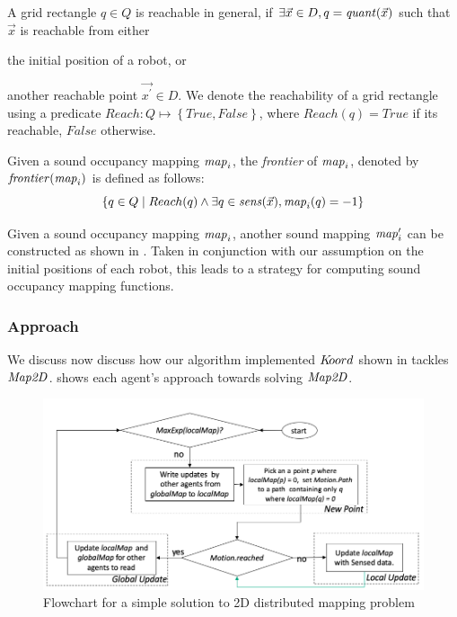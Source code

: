 A grid rectangle $q\in Q$ is reachable in general, if $\exists \Vec{x}\in D, q = \mathit{quant}(\Vec{x})$ such that $\Vec{x}$ is reachable from either \begin{inparaenum} [(a)]\item the initial position of a robot, or \item another reachable point $\Vec{x^\prime}\in D$. We denote the reachability of a grid rectangle using a predicate $\mathit{Reach} : Q \mapsto \left\{\mathit{True}, \mathit{False}\right\}$, where $\mathit{Reach}(q) = \mathit{True}$ if its reachable,  $\mathit{False}$ otherwise.
\end{inparaenum}

\begin{definition}
    Given a sound occupancy mapping $\mathit{map}_i$, the \emph{frontier} of $\mathit{map}_i$, denoted by $\mathit{frontier}(\mathit{map}_i)$ is defined as follows:
    $$ \left\{ q\in Q \mid Reach(q) \wedge \exists q \in \mathit{sens}(\Vec{x}), \mathit{map}_i(q) = -1\right\} $$
\end{definition}

Given a sound occupancy mapping $\mathit{map}_i$, another sound mapping $\mathit{map}_i^\prime$ can be constructed as shown in . Taken in conjunction with our assumption on the initial positions of each robot, this leads to a strategy for computing sound occupancy mapping functions.



\subsubsection{Approach}
We discuss now discuss how our algorithm implemented $K\kern-2pt oord$ shown in  tackles $\mathit{Map2D}$.  shows each agent's approach towards solving $\mathit{Map2D}$.

\begin{figure}[!htbp]
    \centering
    \includegraphics[width=\linewidth]{figs/map_flowchart.png}
    \caption{Flowchart for a simple solution to 2D distributed mapping problem\vspace{-2mm}}
    \label{fig:flowmap}
\end{figure}

